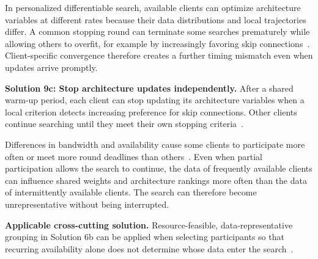In personalized differentiable search, available clients can optimize architecture variables at different rates because their data distributions and local trajectories differ. A common stopping round can terminate some searches prematurely while allowing others to overfit, for example by increasingly favoring skip connections~\cite{collaborative_nas_for_pfl_2025}. Client-specific convergence therefore creates a further timing mismatch even when updates arrive promptly.

\noindent\textbf{Solution 9c: Stop architecture updates independently.} After a shared warm-up period, each client can stop updating its architecture variables when a local criterion detects increasing preference for skip connections. Other clients continue searching until they meet their own stopping criteria~\cite{collaborative_nas_for_pfl_2025}.

Differences in bandwidth and availability cause some clients to participate more often or meet more round deadlines than others~\cite{optimize_fednas_edge_2021,peaches_2024}. Even when partial participation allows the search to continue, the data of frequently available clients can influence shared weights and architecture rankings more often than the data of intermittently available clients. The search can therefore become unrepresentative without being interrupted.

\noindent\textbf{Applicable cross-cutting solution.} Resource-feasible, data-representative grouping in Solution 6b can be applied when selecting participants so that recurring availability alone does not determine whose data enter the search~\cite{network_aware_fed_nas_2025,finch_2024}.
